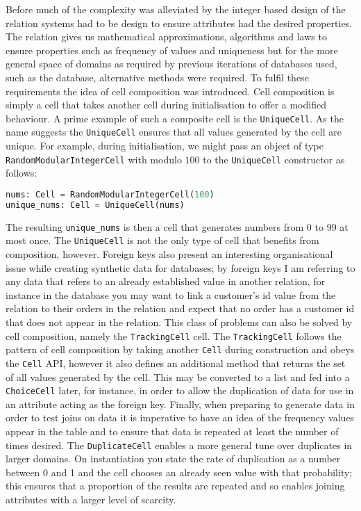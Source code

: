 Before much of the complexity was alleviated by the integer based design of the
 relation systems had to be design to ensure attributes had
the desired properties. The  relation gives us mathematical
approximations, algorithms and laws to ensure properties such as frequency of
values and uniqueness but for the more general space of domains as required by
previous iterations of databases used, such as the  database,
alternative methods were required. To fulfil these requirements the idea of cell
composition was introduced. Cell composition is simply a cell that takes another cell
during initialisation to offer a modified behaviour. A prime example of such a
composite cell is the \lstinline{UniqueCell}. As the name suggests the
\lstinline{UniqueCell} ensures that all values generated by the cell are unique.
For example, during initialisation, we might pass an object of type
\lstinline{RandomModularIntegerCell} with modulo $100$ to the
\lstinline{UniqueCell} constructor as follows:
\begin{lstlisting}[language=Python]
nums: Cell = RandomModularIntegerCell(100)
unique_nums: Cell = UniqueCell(nums)
\end{lstlisting}
The resulting \lstinline{unique_nums} is then a cell that generates numbers from
$0$ to $99$ at most once. The \lstinline{UniqueCell} is not the only type of
cell that benefits from composition, however. Foreign keys also present an
interesting organisational issue while creating synthetic data for databases; by
foreign keys I am referring to any data that refers to an already established
value in another relation, for instance in the  database you
may want to link a customer's id value from the  relation to
their orders in the  relation and expect that no order has a
customer id that does not appear in the  relation. This class
of problems can also be solved by cell composition, namely the
\lstinline{TrackingCell} cell. The \lstinline{TrackingCell} follows the
pattern of cell composition by taking another \lstinline{Cell} during
construction and obeys the \lstinline{Cell} API, however it also defines an
additional method that returns the set of all values generated by the cell. This
may be converted to a list and fed into a \lstinline{ChoiceCell} later, for
instance, in order to allow the duplication of data for use in an attribute
acting as the foreign key.
Finally, when preparing to generate data in order to test joins on data it is
imperative to have an idea of the frequency values appear in the table and to ensure
that data is repeated at least the number of times desired. The
\lstinline{DuplicateCell} enables a more general tune over duplicates in larger
domains. On instantiation you state the rate of duplication as a number
between 0 and 1 and the cell chooses an already seen value with that
probability; this ensures that a proportion of the results are repeated and so
enables joining attributes with a larger level of scarcity.

